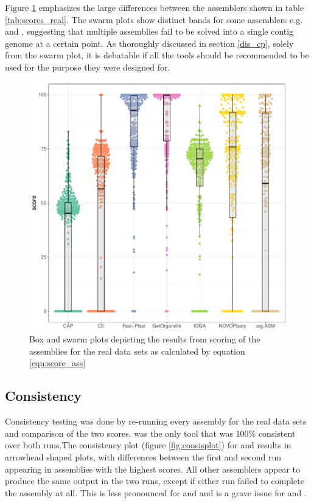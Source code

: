 Figure \ref{fig:swarm} emphasizes the large differences between the assemblers shown in
table \ref{tab:scores_real}. The swarm plots show distinct bands for some assemblers
e.g. \np \hspace{0.25ex} and \oa, suggesting that multiple assemblies fail to be solved
into a single contig genome at a certain point. As thoroughly discussed in section
\ref{dis_cp}, solely from the swarm plot, it is debatable if all the tools should be
recommended to be used for the purpose they were designed for.

\begin{figure}[H]
\centering
\includegraphics[height=.5\textheight, width=.99\textwidth]{Figures/swarm}
\decoRule
\caption[Scores of assemblies from real data sets]{Box and swarm plots depicting the
  results from scoring of the assemblies for the real data sets as calculated by equation
  \ref{eqn:score_ass}}
\label{fig:swarm}
\end{figure}

\subsection{Consistency}

Consistency testing was done by re-running every assembly for the real data sets and
comparison of the two scores. \ce \hspace{0.25ex} was the only tool that was 100\%
consistent over both runs.The consistency plot (figure \ref{fig:consisplot}) for \fp
\hspace{0.25ex} and \np \hspace{0.25ex} results in arrowhead shaped plots, with
differences between the first and second run appearing in assemblies with the highest
scores. All other assemblers appear to produce the same output in the two runs, except if
either run failed to complete the assembly at all. This is less pronounced for \cassp
\hspace{0.25ex} and \go\hspace{0.25ex} and is a grave issue for \oa \hspace{0.25ex} and
\ioga.

